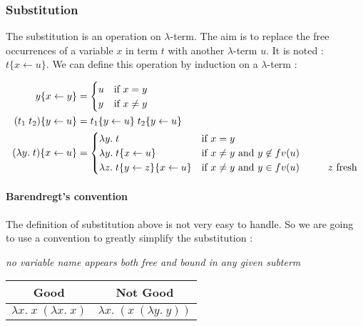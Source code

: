   \subsubsection{Substitution}

  The substitution is an operation on $\lambda$-term. The aim is to replace the
  free occurrences of a variable $x$ in term $t$ with another $\lambda$-term
  $u$. It is noted : $t\{x \leftarrow u\}$. We can define this operation by
  induction on a $\lambda$-term :

  \begin{align*}
    y\{x \leftarrow y\} &= \begin{cases}
      u & \text{if } x = y \\
      y & \text{if } x \not = y
    \end{cases} \\
    (t_1\; t_2)\{y \leftarrow u\} &= t_1\{y \leftarrow u\}\; t_2\{y \leftarrow
    u\} \\
    (\lambda y.\;t)\{x \leftarrow u\} &= \begin{cases}
      \lambda y.\;t &\text{if } x = y \\
      \lambda y.\;t\{x\leftarrow u\} &\text{if } x \not = y \text{ and } y \not
      \in fv(u)\\
      \lambda z.\;t\{y\leftarrow z\}\{x\leftarrow u\} &\text{if } x \not = y \text{ and } y \in
      fv(u) \text{\hspace{1cm}$z$ fresh}\\
    \end{cases}
  \end{align*}

  \paragraph{Barendregt's convention} The definition of substitution above is
  not very easy to handle. So we are going to use a convention to greatly
  simplify the substitution :

  \begin{center}
    \textit{no variable name appears both free and bound in any given subterm}
  \end{center}

  \begin{center}
    \begin{tabular}{c|c}
      Good & Not Good \\
      \hline
      $\lambda x.\;x\;(\lambda x.\;x)$ & $\lambda x.\;(x\;(\lambda y.\;y))$
    \end{tabular}
  \end{center}

